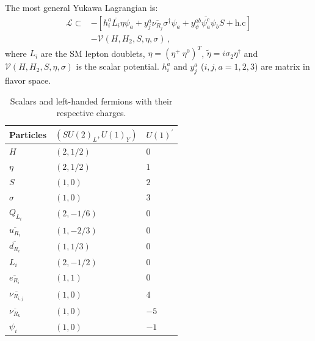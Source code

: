 \documentclass[12pt]{article}
\begin{document}
The most general Yukawa Lagrangian is:
%
\begin{align*}
\label{Eq:LagY}
    \mathcal{L} \subset& -[ 
    h^{a}_{i} \overline{L_{i}} \eta \psi_{a} +  y^{a}_{j} \overline{\nu_{R_{j}}} \sigma^{\dagger} \psi_{a} + y_{\psi}^{a b} \overline{\psi^{c}_{a}} \psi_{b} S + \text{h.c}] \\
    &- \mathcal{V}(H, H_{2}, S, \eta, \sigma)\,,
\end{align*}
%
where $L_{i}$ are the SM lepton doublets, $\eta = \left( \eta^{+} \ \eta^{0} \right)^{T}$, $\widetilde{\eta} = i \sigma_2 \eta^{\dagger}$ and $\mathcal{V}(H, H_{2}, S, \eta, \sigma)$ is the scalar potential. $h^{a}_i$ and $y^{a}_{j}$ ($i,j,a=1,2,3$) are matrix in flavor space.
%
\begin{table}
  \centering
  \begin{tabular}{|l|l|l|}
    \hline  
    Particles     & $\left( SU(2)_L, U(1)_Y \right)$ & $U(1)^{\prime}$ \\ \hline
    $H $  & $(2, 1/2)$ &  0 \\
    $\eta$ & $(2,1/2)$ & $1$ \\
    $S$ & $(1,0)$ & $2$ \\
    $\sigma$ & $(1,0)$ & $3$ \\
    \hline
    $Q_{L_{i}}$  & $(2,-1/6)$ & $0$ \\
    $\overline{u_{R_{i}}}$ & $(1,-2/3)$ & $0$ \\
    $\overline{d_{R_{i}}}$ & $(1,1/3)$ & $0$ \\
    \hline
    $L_i$  & $(2,-1/2)$ & $0$ \\
    $\overline{e_{R_i}}$ & $(1,1)$ & $0$ \\
    $\overline{\nu_{R_{i,j}}}$ & $(1,0)$ & $4$\\
    $\overline{\nu_{R_k}}$ & $(1,0)$ & $-5$\\
    $\psi_{i}$  & $(1,0)$ & $-1$ \\\hline
  \end{tabular}
  \caption{Scalars and left-handed fermions with their respective charges.}
  \label{tab:partcont}
\end{table}
%
\end{document}
